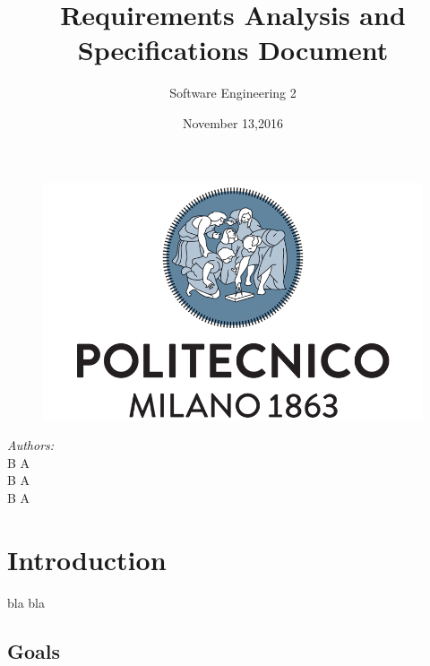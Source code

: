 \documentclass[a4paper]{article}
\title{Requirements Analysis and Specifications Document}
\author{Software Engineering 2}
\date{November 13,2016}
\begin{document}
\maketitle

\begin{figure}[h]
  \centering
  \includegraphics[width=300 pt]{resources/polimi.png}
  \label{fig:polimi}
\end{figure}

\begin{minipage}{0.4\textwidth}
\begin{flushleft} \large
\emph{Authors:}\\
B \textsc{A}\\
B \textsc{A}\\
B \textsc{A}
\end{flushleft}
\end{minipage}

\newpage
{}

\tableofcontents

\newpage

\section{Introduction}
bla bla
\subsection{Goals}
\end{document}
